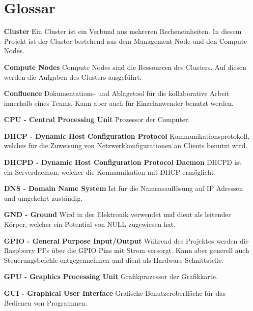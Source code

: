 \section{Glossar}
\textbf{Cluster}\newline
Ein Cluster ist ein Verbund aus mehreren Recheneinheiten. In diesem Projekt ist der Cluster bestehend aus dem Management Node und den Compute Nodes.

\textbf{Compute Nodes}\newline
Compute Nodes sind die Ressourcen des Clusters. Auf diesen werden die Aufgaben des Clusters ausgeführt.

\textbf{Confluence}\newline
Dokumentations- und Ablagetool für die kollaborative Arbeit innerhalb eines Teams. Kann aber auch für Einzelanwender benutzt werden. 

\textbf{CPU - Central Processing Unit}\newline
Prozessor der Computer.

\textbf{DHCP - Dynamic Host Configuration Protocol}\newline
Kommunikationsprotokoll, welches für die Zuweisung von Netzwerkkonfigurationen an Clients benutzt wird.

\textbf{DHCPD - Dynamic Host Configuration Protocol Daemon}\newline
DHCPD ist ein Serverdaemon, welcher die Kommunikation mit DHCP ermöglicht.

\textbf{DNS - Domain Name System}\newline
Ist für die Namensauflösung auf IP Adressen und umgekehrt zuständig.

\textbf{GND - Ground}\newline
Wird in der Elektronik verwendet und dient als leitender Körper, welcher ein Potential von NULL zugewiesen hat. 

\textbf{GPIO - General Purpose Input/Output}\newline
Während des Projektes werden die Raspberry PI's über die GPIO Pins mit Strom versorgt. Kann aber generell auch Steuerungsbefehle entgegennehmen und dient als Hardware Schnittstelle.

\textbf{GPU - Graphics Processing Unit}\newline
Grafikprozessor der Grafikkarte.

\textbf{GUI - Graphical User Interface}\newline
Grafische Benutzeroberfläche für das Bedienen von Programmen.

